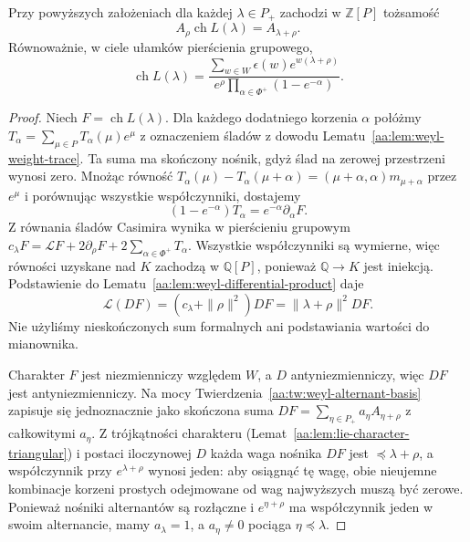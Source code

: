 \begin{twierdzenie}
\label{aa:tw:weyl-character-formula}
Przy powyższych założeniach dla każdej $\lambda\in P_+$ zachodzi w $\mathbb Z[P]$ tożsamość
\[
 A_\rho\operatorname{ch}L(\lambda)=A_{\lambda+\rho}.
\]
Równoważnie, w ciele ułamków pierścienia grupowego,
\[
 \operatorname{ch}L(\lambda)=
 \frac{\sum_{w\in W}\epsilon(w)e^{w(\lambda+\rho)}}
 {e^\rho\prod_{\alpha\in\Phi^+}(1-e^{-\alpha})}.
\]
\end{twierdzenie}
\begin{proof}
Niech $F=\operatorname{ch}L(\lambda)$. Dla każdego dodatniego korzenia $\alpha$ połóżmy $T_\alpha=\sum_{\mu\in P}T_\alpha(\mu)e^\mu$ z oznaczeniem śladów z dowodu Lematu~\ref{aa:lem:weyl-weight-trace}. Ta suma ma skończony nośnik, gdyż ślad na zerowej przestrzeni wynosi zero. Mnożąc równość $T_\alpha(\mu)-T_\alpha(\mu+\alpha)=(\mu+\alpha,\alpha)m_{\mu+\alpha}$ przez $e^\mu$ i porównując wszystkie współczynniki, dostajemy
\[
 (1-e^{-\alpha})T_\alpha=e^{-\alpha}\partial_\alpha F.
\]
Z równania śladów Casimira wynika w pierścieniu grupowym
$c_\lambda F=\mathcal LF+2\partial_\rho F+2\sum_{\alpha\in\Phi^+}T_\alpha$.
Wszystkie współczynniki są wymierne, więc równości uzyskane nad $K$ zachodzą w $\mathbb Q[P]$, ponieważ $\mathbb Q\to K$ jest iniekcją. Podstawienie do Lematu~\ref{aa:lem:weyl-differential-product} daje
\[
 \mathcal L(DF)=(c_\lambda+\|\rho\|^2)DF
                 =\|\lambda+\rho\|^2 DF.
\]
Nie użyliśmy nieskończonych sum formalnych ani podstawiania wartości do mianownika.

Charakter $F$ jest niezmienniczy względem $W$, a $D$ antyniezmienniczy, więc $DF$ jest antyniezmienniczy. Na mocy Twierdzenia~\ref{aa:tw:weyl-alternant-basis} zapisuje się jednoznacznie jako skończona suma
$DF=\sum_{\eta\in P_+}a_\eta A_{\eta+\rho}$ z całkowitymi $a_\eta$. Z trójkątności charakteru (Lemat~\ref{aa:lem:lie-character-triangular}) i postaci iloczynowej $D$ każda waga nośnika $DF$ jest $\preceq\lambda+\rho$, a współczynnik przy $e^{\lambda+\rho}$ wynosi jeden: aby osiągnąć tę wagę, obie nieujemne kombinacje korzeni prostych odejmowane od wag najwyższych muszą być zerowe. Ponieważ nośniki alternantów są rozłączne i $e^{\eta+\rho}$ ma współczynnik jeden w swoim alternancie, mamy $a_\lambda=1$, a $a_\eta\ne0$ pociąga $\eta\preceq\lambda$.


\end{proof}
